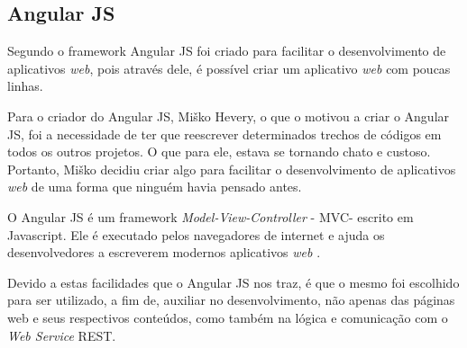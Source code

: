 \subsection{Angular JS}

Segundo  o framework Angular JS foi criado para facilitar o desenvolvimento de aplicativos \textit{web}, pois através dele, é possível criar um aplicativo \textit{web} com poucas linhas.

Para o criador do Angular JS, Miško Hevery, o que o motivou a criar o Angular JS, foi a necessidade de ter que reescrever determinados trechos de códigos em todos os outros projetos. O que para ele, estava se tornando chato e custoso. Portanto, Miško decidiu criar algo para facilitar o desenvolvimento de aplicativos \textit{web} de uma forma que ninguém havia pensado antes.

O Angular JS é um framework \textit{Model-View-Controller} - MVC\footnotemark[27] - escrito em Javascript. Ele é executado pelos navegadores de internet e ajuda os desenvolvedores a escreverem modernos aplicativos \textit{web} \cite{kozlowski_darwin_mastering_web_application_angular_js}.


Devido a estas facilidades que o Angular JS nos traz, é que o mesmo foi escolhido para ser utilizado, a fim de, auxiliar no desenvolvimento, não apenas das páginas web e seus respectivos conteúdos, como também na lógica e comunicação com o \textit{Web Service} REST.
